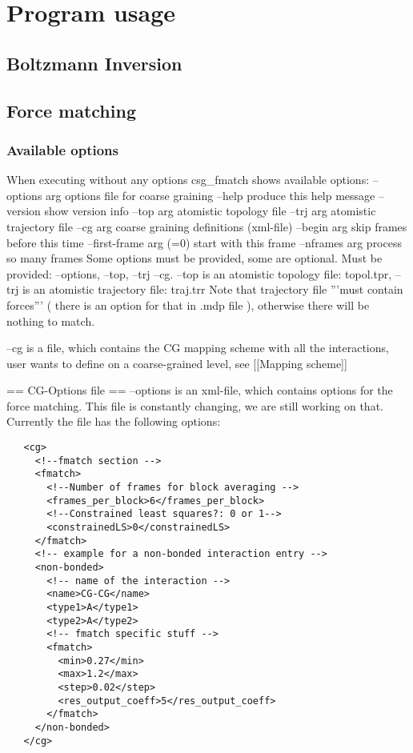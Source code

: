 \chapter{Program usage}
\section{Boltzmann Inversion}
\section{Force matching}
\subsection{Available options}
When executing without any options csg\_fmatch shows available options:
  --options arg          options file for coarse graining
  --help                 produce this help message
  --version              show version info
  --top arg              atomistic topology file
  --trj arg              atomistic trajectory file
  --cg arg               coarse graining definitions (xml-file)
  --begin arg            skip frames before this time
  --first-frame arg (=0) start with this frame
  --nframes arg          process so many frames
Some options must be provided, some are optional. Must be provided: --options, --top, --trj --cg.
--top is an atomistic topology file: topol.tpr, --trj is an atomistic trajectory file: traj.trr
Note that trajectory file '''must contain forces''' ( there is an option for that in .mdp file ), otherwise there will be nothing to match.

--cg is a file, which contains the CG mapping scheme with all the interactions, user wants to define on a coarse-grained level, see [[Mapping scheme]]

== CG-Options file ==
--options is an xml-file, which contains options for the force matching. This file is constantly changing, we are still working on that.
Currently the file has the following options:
\begin{verbatim}
   <cg>
     <!--fmatch section -->
     <fmatch>
       <!--Number of frames for block averaging -->
       <frames_per_block>6</frames_per_block>
       <!--Constrained least squares?: 0 or 1-->
       <constrainedLS>0</constrainedLS>
     </fmatch>
     <!-- example for a non-bonded interaction entry -->
     <non-bonded>
       <!-- name of the interaction -->
       <name>CG-CG</name>
       <type1>A</type1>
       <type2>A</type2>
       <!-- fmatch specific stuff -->
       <fmatch>
         <min>0.27</min>
         <max>1.2</max>
         <step>0.02</step>
         <res_output_coeff>5</res_output_coeff>
       </fmatch>
     </non-bonded>
   </cg>
\end{verbatim}

